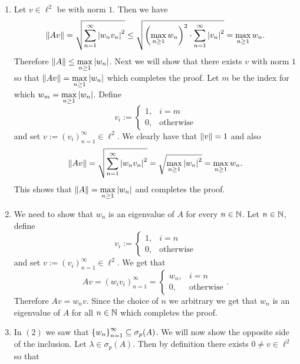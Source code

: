 \documentclass[11pt,a4paper]{article}
\begin{document}
\begin{solution} \phantom{}
  \begin{enumerate}
    \item[(1)] Let $v \in \ell^2$ be with norm $1$.
      Then we have
      \[
        \norm{Av} =
        \sqrt{\sum_{n=1}^{\infty} \abs{w_n v_n}^2} \le
      \sqrt{\del{\max_{n \geq 1} w_n}^2 \cdot \sum_{n=1}^{\infty} \abs{v_n}^2} =
        \max_{n \geq 1} w_n.
      \]
      Therefore $\left\lVert A\right\rVert \le \max\limits_{n \geq 1} \left\lvert w_n\right\rvert$.
      Next we will show that there exists $v$ with norm $1$
      so that $\left\lVert Av\right\rVert = \max\limits_{n \geq 1} \left\lvert w_n\right\rvert$
      which completes the proof.
      Let $m$ be the index for which $w_m = \max\limits_{n \geq 1} \left\lvert w_n\right\rvert$.
      Define
      \[
        v_i :=
        \begin{cases}
          1, &i = m \\
          0, &\text{otherwise}
        \end{cases}
      \]
      and set $v := (v_i)_{n=1}^{\infty} \in \ell^2$.
      We clearly have that $\left\lVert v\right\rVert = 1$ and also
      \[
        \left\lVert Av\right\rVert =
        \sqrt{\sum_{n=1}^{\infty} \left\lvert w_n v_n\right\rvert^2} =
        \sqrt{\max_{n \geq 1} \left\lvert w_n\right\rvert^2} =
        \max_{n \geq 1} w_n.
      \]
      This shows that $\left\lVert A\right\rVert = \max\limits_{n \geq 1} \left\lvert w_n\right\rvert$ and
      completes the proof.
    \item[(2)] We need to show that $w_n$ is an eigenvalue of $A$
      for every $n \in \mathbb{N}$.
      Let $n \in \mathbb{N}$, define
      \[
        v_i :=
        \begin{cases}
          1, &i = n \\
          0, &\text{otherwise}
        \end{cases}
      \]
      and set $v := (v_i)_{n=1}^{\infty} \in \ell^2$.
      We get that
      \[
        Av =
        (w_i v_i)_{n=1}^{\infty} =
        \begin{cases}
          w_n, &i = n \\
          0, &\text{otherwise}
        \end{cases}.
      \]
      Therefore $Av = w_n v$.
      Since the choice of $n$ we arbitrary we get that
      $w_n$ is an eigenvalue of $A$ for all $n \in \mathbb{N}$ which completes the
      proof.
    \item[(3)] In $(2)$
      we saw that $\left\{w_n\right\}_{n=1}^{\infty} \subseteq \sigma_p(A)$.
      We will now show the opposite side of the inclusion.
      Let $\lambda \in \sigma_p(A)$.
      Then by definition there exists $0 \neq v \in \ell^2$ so that

\end{enumerate}
\end{solution}
\end{document}
